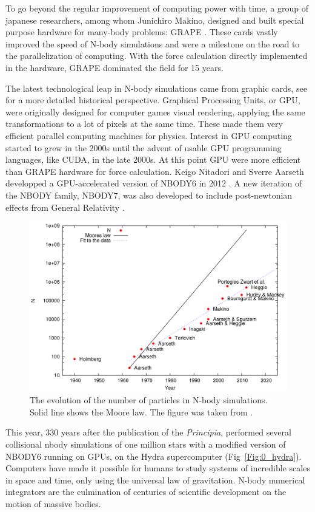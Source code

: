 To go beyond the regular improvement of computing power with time, a group of japanese researchers, among whom Junichiro Makino, designed and built special purpose hardware for many-body problems: GRAPE \citep{Ebisuzaki1990,Ito1991}. These cards vastly improved the speed of N-body simulations and were a milestone on the road to the parallelization of computing. With the force calculation directly implemented in the hardware, GRAPE dominated the field for 15 years.

The latest technological leap in N-body simulations came from graphic cards, see \cite{Bedorf2012} for a more detailed historical perspective. Graphical Processing Units, or GPU, were originally designed for computer games visual rendering, applying the same transformations to a lot of pixels at the same time. These made them very efficient parallel computing machines for physics. Interest in GPU computing started to grew in the 2000s \citep{Nyland2004,Elsen2006,SPZ2007} until the advent of usable GPU programming languages, like CUDA, in the late 2000s. At this point GPU were more efficient than GRAPE hardware for force calculation. Keigo Nitadori and Sverre Aarseth developped a GPU-accelerated version of NBODY6 in 2012 \citep{Nitadori2012}. A new iteration of the NBODY family, NBODY7, was also developed to include post-newtonian effects from General Relativity \citep{Aarseth2012}.

\begin{figure}
\label{Fig:N_increase}
\includegraphics[width=0.9\linewidth]{Figures/0_N_increase.png}
\caption[The evolution of the number of particles in N-body simulations]{The evolution of the number of particles in N-body simulations. Solid line shows the Moore law. The figure was taken from \protect\cite{Bedorf2012}. }
\end{figure}


This year, 330 years after the publication of the \textit{Principia}, \cite{Wang2016} performed several collisional nbody simulations of one million stars with a modified version of NBODY6 running on GPUs, on the Hydra supercomputer (Fig~\ref{Fig:0_hydra}). Computers have made it possible for humans to study systems of incredible scales in space and time, only using the universal law of gravitation. N-body numerical integrators are the culmination of centuries of scientific development on the motion of massive bodies.